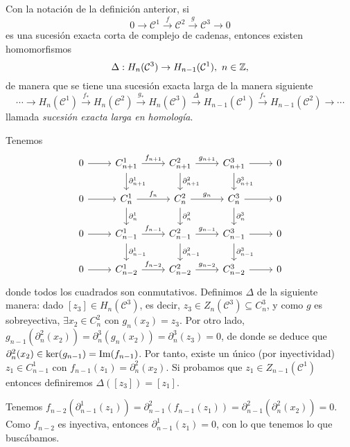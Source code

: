 \documentclass[HS.tex]{subfiles}
\begin{document}
\begin{prop}
Con la notación de la definición anterior, si 
\[
0\to \mathcal{C}^1\overset{f}{\to}\mathcal{C}^2\overset{g}{\to}\mathcal{C}^3\to 0
\]
es una sucesión exacta corta de complejo de cadenas, entonces existen homomorfismos
\[
\Delta:H_n(\mathcal{C}^3)\to H_{n-1}(\mathcal{C}^1),\ n\in\mathbb{Z},
\]
de manera que se tiene una sucesión exacta larga de la manera siguiente
\[
\cdots\to H_n(\mathcal{C}^1)\overset{f_*}{\to}H_n(\mathcal{C}^2)\overset{g_*}{\to}H_n(\mathcal{C}^3)\overset{\Delta}{\to}H_{n-1}(\mathcal{C}^1)\overset{f_*}{\to}H_{n-1}(\mathcal{C}^2)\to\cdots
\]
llamada \emph{sucesión exacta larga en homología}.
\end{prop}

\begin{dem}
Tenemos
\[\begin{tikzcd}
0\arrow[r] & C_{n+1}^1\arrow[r, "f_{n+1}"]\arrow[d, "\partial_{n+1}^1"]& C_{n+1}^2\arrow[r, "g_{n+1}"]\arrow[d,"\partial_{n+1}^2"]& C_{n+1}^3\arrow[r]\arrow[d,"\partial_{n+1}^3"] & 0\\
0\arrow[r] & C_{n}^1\arrow[r, "f_{n}"]\arrow[d, "\partial_{n}^1"]& C_n^2\arrow[r, "g_{n}"]\arrow[d,"\partial_{n}^2"]& C_{n}^3\arrow[r]\arrow[d,"\partial_{n}^3"] & 0\\
0\arrow[r] & C_{n-1}^1\arrow[r, "f_{n-1}"]\arrow[d, "\partial_{n-1}^1"]& C_{n-1}^2\arrow[r, "g_{n-1}"] \arrow[d,"\partial_{n-1}^2"]& C_{n-1}^3\arrow[r]\arrow[d,"\partial_{n-1}^3"]&  0\\
0\arrow[r] & C_{n-2}^1\arrow[r, "f_{n-2}"]& C_{n-2}^2\arrow[r, "g_{n-2}"]& C_{n-2}^3\arrow[r] & 0
\end{tikzcd}
\]
donde todos los cuadrados son conmutativos. Definimos $\Delta$ de la siguiente manera: dado $[z_3]\in H_n(\mathcal{C}^3)$, es decir, $z_3\in Z_n(\mathcal{C}^3)\subseteq C_n^3$, y como $g$ es sobreyectiva, $\exists x_2\in C_n^2$ con $g_n(x_2)=z_3$. Por otro lado, $g_{n-1}(\partial_n^2(x_2))=\partial_n^3(g_n(x_2))=\partial_n^3(z_3)=0$, de donde se deduce que $\partial_n^2(x_2)\in\ker(g_{n-1})=\operatorname{Im}(f_{n-1})$. Por tanto, existe un único (por inyectividad) $z_1\in C_{n-1}^1$ con $f_{n-1}(z_1)=\partial^2_n(x_2)$. Si probamos que $z_1\in Z_{n-1}(\mathcal{C}^1)$ entonces definiremos $\Delta([z_3])=[z_1]$.  

Tenemos $f_{n-2}(\partial^1_{n-1}(z_1))=\partial^2_{n-1}(f_{n-1}(z_1))=\partial^2_{n-1}(\partial^2_n(x_2))=0$. Como $f_{n-2}$ es inyectiva, entonces $\partial^1_{n-1}(z_1)=0$, con lo que tenemos lo que buscábamos.


\end{dem}
\end{document}
